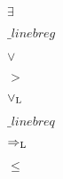 \documentclass{article}
\begin{document}
$\exists$
\pagebreak

$\_linebr eg$
\pagebreak

$\lor$
\pagebreak

$>$
\pagebreak

$\lor_{\rm L}$
\pagebreak

$\_linebr eq$
\pagebreak

$\Rightarrow_{\rm L}$
\pagebreak

$\leq$
\pagebreak
\end{document}
